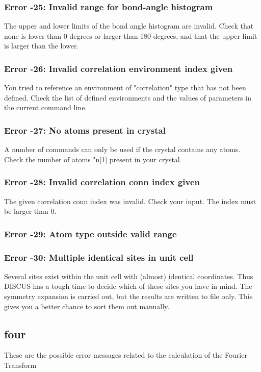 \subsubsection{Error -25: Invalid range for bond-angle histogram}
\par
The upper and lower limits of the bond angle histogram are invalid. 
Check that none is lower than 0 degrees or larger than 180 degrees, 
and that the upper limit is larger than the lower. 
\subsubsection{Error -26: Invalid correlation environment index given}
\par
You tried to reference an environment of "correlation" type that 
has not been defined. Check the list of defined environments and 
the values of parameters in the current command line. 
\subsubsection{Error -27: No atoms present in crystal}
\par
A number of commands can only be used if the crystal contains 
any atoms. 
Check the number of atoms "n[1] present in your crystal. 
\subsubsection{Error -28: Invalid correlation conn   index given}
\par
The given correlation conn index was invalid. Check your input. 
The index must be larger than 0. 
\subsubsection{Error -29: Atom type outside valid range}
\subsubsection{Error -30: Multiple identical sites in unit cell}
\par
Several sites exist within the unit cell with (almost) identical 
coordinates. Thus DISCUS has a tough time to decide which of these 
sites you have in mind. 
The symmetry expansion is carried out, but the results are written to 
file only. This gives you a better chance to sort them out manually. 
\subsection*{four}
These are the possible error messages related to the calculation 
of the Fourier Transform 
\par
